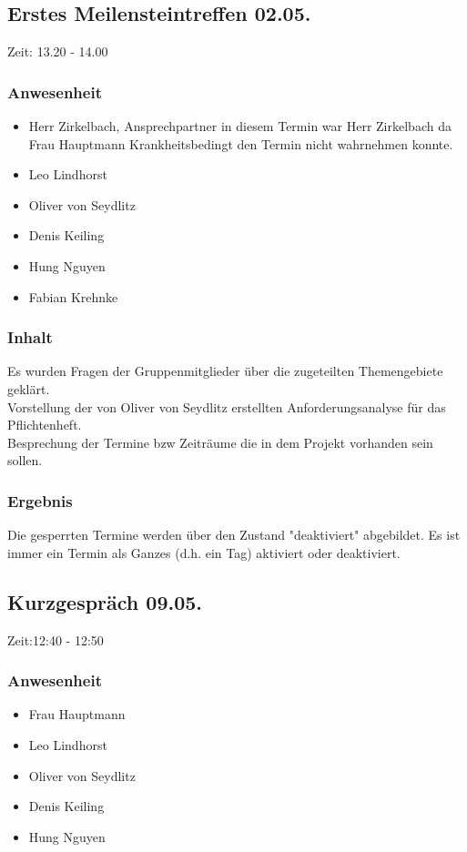 \subsection{Erstes Meilensteintreffen 02.05.} 

Zeit: 13.20 - 14.00

\subsubsection{Anwesenheit}
\begin{itemize}
	\item Herr Zirkelbach, Ansprechpartner in diesem Termin war Herr Zirkelbach da Frau Hauptmann Krankheitsbedingt den Termin nicht wahrnehmen konnte.
	\item Leo Lindhorst
	\item Oliver von Seydlitz
	\item Denis Keiling
	\item Hung Nguyen
	\item Fabian Krehnke
\end{itemize}

\subsubsection{Inhalt}
Es wurden Fragen der Gruppenmitglieder über die zugeteilten Themengebiete geklärt.
\\Vorstellung der von Oliver von Seydlitz erstellten Anforderungsanalyse für das Pflichtenheft. 
\\Besprechung der Termine bzw Zeiträume die in dem Projekt vorhanden sein sollen.

\subsubsection{Ergebnis}
Die gesperrten Termine werden über den Zustand "deaktiviert" abgebildet. Es ist immer ein Termin als Ganzes (d.h. ein Tag) aktiviert oder deaktiviert.


\subsection{Kurzgespräch 09.05.}

Zeit:12:40 - 12:50 

\subsubsection{Anwesenheit}
\begin{itemize}
	\item Frau Hauptmann
	\item Leo Lindhorst
	\item Oliver von Seydlitz
	\item Denis Keiling
	\item Hung Nguyen
\end{itemize}

